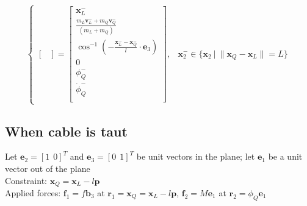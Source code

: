 \documentclass[11pt]{article}
\begin{document}
\[\begin{cases}
\begin{bmatrix}
\end{bmatrix}
= 
\begin{bmatrix}
       \mathbf{x}_L^- \\ 
       \frac{ m_L \mathbf{v}_L^- + m_Q \mathbf{v}_Q ^-} { (m_L+m_Q) } \\ 
       \cos^{-1} ( - \frac{ \mathbf{x}_L^- - \mathbf{x}_Q^- } {l} \cdot \mathbf{e}_3 ) \\ 
       0 \\
       \phi_Q^- \\ 
       \dot{\phi}_Q^- \\
\end{bmatrix} , 
&  
\mathbf{x}_2^- \in \{ \mathbf{x}_2 \ | \  \| \mathbf{x}_Q - \mathbf{x}_L \| = L \}
\end{cases}
\]





\newpage
\subsection{When cable is taut}

Let $\mathbf{e}_2 = [1 \ \ 0]^T$ and $\mathbf{e}_3 = [0 \ \ 1]^T$ be unit vectors in the plane; let $\mathbf{e}_1$ be a unit vector out of the plane \\
Constraint: $\mathbf{x}_Q = \mathbf{x}_L - l \mathbf{p}$ \\
Applied forces: $\mathbf{f}_1 = f \mathbf{b}_3$ at $\mathbf{r}_1 = \mathbf{x}_Q = \mathbf{x}_L - l \mathbf{p}$, $\mathbf{f}_2 = M \mathbf{e}_1$ at $\mathbf{r}_2 = \phi_Q \mathbf{e}_1$ \\ 
\end{document}
